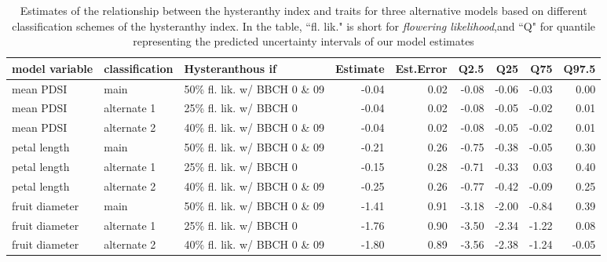 \documentclass{article}[11pt]
\begin{document}
\begin{table}[ht]
\centering
\begin{tabular}[width=.8\textwidth]{|lllrrrrrr|}
  \hline
 model variable & classification & Hysteranthous if & Estimate & Est.Error & Q2.5 & Q25 & Q75 & Q97.5 \\ 
  \hline
 mean PDSI & main & 50\% fl. lik.  w/ BBCH 0 \& 09 & -0.04 & 0.02 & -0.08 & -0.06 & -0.03 & 0.00 \\ 
 mean PDSI & alternate 1 & 25\% fl. lik. w/ BBCH 0 & -0.04 & 0.02 & -0.08 & -0.05 & -0.02 & 0.01 \\ 
 mean PDSI & alternate 2 & 40\% fl. lik. w/ BBCH 0 \& 09 & -0.04 & 0.02 & -0.08 & -0.05 & -0.02 & 0.01 \\ 
  \hline
 petal length & main & 50\% fl. lik.  w/ BBCH 0 \& 09 & -0.21 & 0.26 & -0.75 & -0.38 & -0.05 & 0.30 \\ 
 petal length & alternate 1 & 25\% fl. lik. w/ BBCH 0 & -0.15 & 0.28 & -0.71 & -0.33 & 0.03 & 0.40 \\ 
 petal length & alternate 2 & 40\% fl. lik. w/ BBCH 0 \& 09 & -0.25 & 0.26 & -0.77 & -0.42 & -0.09 & 0.25 \\ 
  \hline
 fruit diameter & main & 50\% fl. lik.  w/ BBCH 0 \& 09 & -1.41 & 0.91 & -3.18 & -2.00 & -0.84 & 0.39 \\ 
 fruit diameter & alternate 1 & 25\% fl. lik. w/ BBCH 0 & -1.76 & 0.90 & -3.50 & -2.34 & -1.22 & 0.08 \\ 
fruit diameter & alternate 2 & 40\% fl. lik. w/ BBCH 0 \& 09 & -1.80 & 0.89 & -3.56 & -2.38 & -1.24 & -0.05 \\ 
   \hline
\end{tabular}
\caption{Estimates of the relationship between the hysteranthy index and traits for three alternative models based on different classification schemes of the hysteranthy index. In the table, ``fl. lik." is short for \emph{flowering likelihood},and ``Q" for quantile representing the predicted uncertainty intervals of our model estimates }
\label{tab:modput}
\end{table}
\pagebreak
\end{document}

